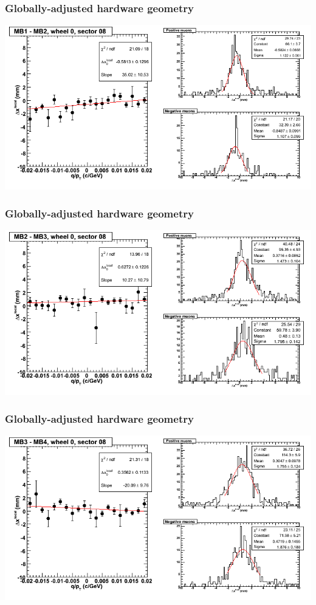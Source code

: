 \documentclass[compress]{beamer}
\begin{document}
\begin{frame}
\frametitle{Globally-adjusted hardware geometry}
\includegraphics[width=\linewidth]{NOV4_segdiffs_HW/dt13_resid_C_08_12.png}
\end{frame}

\begin{frame}
\frametitle{Globally-adjusted hardware geometry}
\includegraphics[width=\linewidth]{NOV4_segdiffs_HW/dt13_resid_C_08_23.png}
\end{frame}

\begin{frame}
\frametitle{Globally-adjusted hardware geometry}
\includegraphics[width=\linewidth]{NOV4_segdiffs_HW/dt13_resid_C_08_34.png}
\end{frame}
\end{document}
